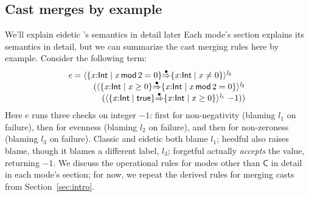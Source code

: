 \documentclass[9pt]{extarticle}
\newcommand{\ottnt}[1]{\mathit{#1}}
\newcommand{\ottsym}[1]{#1}
\begin{document}
{\iffull
\subsection{Cast merges by example}
\label{sec:example}

\ifpopl We'll explain eidetic \lambdah's semantics in detail later\else
Each mode's section explains its semantics in detail\fi, but we can
summarize the cast merging rules here by example. Consider the
following term:
\[ \begin{array}{@{}l@{} }  \ottnt{e}  \ottsym{=}   \langle   \{ \mathit{x} \mathord{:}  \mathsf{Int}  \mathrel{\mid}  \mathit{x} \,  \mathsf{mod}  \, \ottsym{2}  \mathrel{=}  \ottsym{0}  \}   \mathord{ \overset{\bullet}{\Rightarrow} }   \{ \mathit{x} \mathord{:}  \mathsf{Int}  \mathrel{\mid}  \mathit{x}  \mathrel{\ne}  \ottsym{0}  \}   \rangle^{ \ottnt{l_{{\mathrm{3}}}} } ~  {} \\  \qquad  \quad   (  \langle   \{ \mathit{x} \mathord{:}  \mathsf{Int}  \mathrel{\mid}  \mathit{x}  \mathrel{\ge}  \ottsym{0}  \}   \mathord{ \overset{\bullet}{\Rightarrow} }   \{ \mathit{x} \mathord{:}  \mathsf{Int}  \mathrel{\mid}  \mathit{x} \,  \mathsf{mod}  \, \ottsym{2}  \mathrel{=}  \ottsym{0}  \}   \rangle^{ \ottnt{l_{{\mathrm{2}}}} } ~  {} \\  \qquad  \qquad   (  \langle   \{ \mathit{x} \mathord{:}  \mathsf{Int}  \mathrel{\mid}  \mathsf{true}  \}   \mathord{ \overset{\bullet}{\Rightarrow} }   \{ \mathit{x} \mathord{:}  \mathsf{Int}  \mathrel{\mid}  \mathit{x}  \mathrel{\ge}  \ottsym{0}  \}   \rangle^{ \ottnt{l_{{\mathrm{1}}}} } ~   {-1}   )   )    \end{array} \]
Here $\ottnt{e}$ runs three checks on integer $ {-1} $: first for
non-negativity (blaming $\ottnt{l_{{\mathrm{1}}}}$ on failure), then for evenness
(blaming $\ottnt{l_{{\mathrm{2}}}}$ on failure), and then for non-zeroness (blaming
$\ottnt{l_{{\mathrm{3}}}}$ on failure).
Classic and eidetic \lambdah both blame $\ottnt{l_{{\mathrm{1}}}}$; heedful \lambdah
also raises blame, though it blames a different label, $\ottnt{l_{{\mathrm{3}}}}$;
forgetful \lambdah actually \textit{accepts} the value, returning
$ {-1} $. We discuss the operational rules for modes other than
$ \mathsf{C} $ in detail in each mode's section; for now, we repeat the
derived rules for merging casts from Section~\ref{sec:intro}.

}
\end{document}
